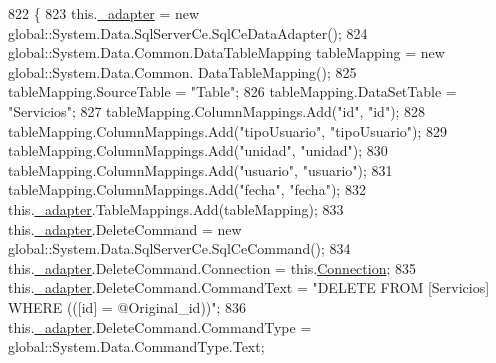 \begin{DoxyCode}
822                                    \{
823             this.\hyperlink{class_proyecto___integrador__3_1_1ds_servicios_table_adapters_1_1_servicios_table_adapter_adef36d1c06bafba740cd2cb94515689b}{\_adapter} = \textcolor{keyword}{new} global::System.Data.SqlServerCe.SqlCeDataAdapter();
824             global::System.Data.Common.DataTableMapping tableMapping = \textcolor{keyword}{new} global::System.Data.Common.
      DataTableMapping();
825             tableMapping.SourceTable = \textcolor{stringliteral}{"Table"};
826             tableMapping.DataSetTable = \textcolor{stringliteral}{"Servicios"};
827             tableMapping.ColumnMappings.Add(\textcolor{stringliteral}{"id"}, \textcolor{stringliteral}{"id"});
828             tableMapping.ColumnMappings.Add(\textcolor{stringliteral}{"tipoUsuario"}, \textcolor{stringliteral}{"tipoUsuario"});
829             tableMapping.ColumnMappings.Add(\textcolor{stringliteral}{"unidad"}, \textcolor{stringliteral}{"unidad"});
830             tableMapping.ColumnMappings.Add(\textcolor{stringliteral}{"usuario"}, \textcolor{stringliteral}{"usuario"});
831             tableMapping.ColumnMappings.Add(\textcolor{stringliteral}{"fecha"}, \textcolor{stringliteral}{"fecha"});
832             this.\hyperlink{class_proyecto___integrador__3_1_1ds_servicios_table_adapters_1_1_servicios_table_adapter_adef36d1c06bafba740cd2cb94515689b}{\_adapter}.TableMappings.Add(tableMapping);
833             this.\hyperlink{class_proyecto___integrador__3_1_1ds_servicios_table_adapters_1_1_servicios_table_adapter_adef36d1c06bafba740cd2cb94515689b}{\_adapter}.DeleteCommand = \textcolor{keyword}{new} global::System.Data.SqlServerCe.SqlCeCommand();
834             this.\hyperlink{class_proyecto___integrador__3_1_1ds_servicios_table_adapters_1_1_servicios_table_adapter_adef36d1c06bafba740cd2cb94515689b}{\_adapter}.DeleteCommand.Connection = this.\hyperlink{class_proyecto___integrador__3_1_1ds_servicios_table_adapters_1_1_servicios_table_adapter_afdc3759c0f8fd84ed6ae2943ee4855f5}{Connection};
835             this.\hyperlink{class_proyecto___integrador__3_1_1ds_servicios_table_adapters_1_1_servicios_table_adapter_adef36d1c06bafba740cd2cb94515689b}{\_adapter}.DeleteCommand.CommandText = \textcolor{stringliteral}{"DELETE FROM [Servicios] WHERE (([id] =
       @Original\_id))"};
836             this.\hyperlink{class_proyecto___integrador__3_1_1ds_servicios_table_adapters_1_1_servicios_table_adapter_adef36d1c06bafba740cd2cb94515689b}{\_adapter}.DeleteCommand.CommandType = global::System.Data.CommandType.Text;

\end{DoxyCode}
